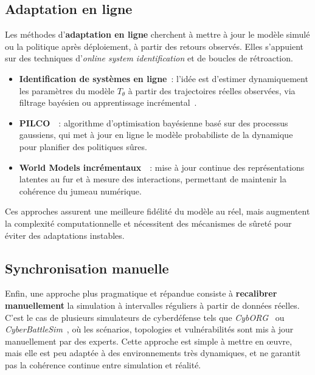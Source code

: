 \subsection{Adaptation en ligne}

\noindent
Les méthodes d’\textbf{adaptation en ligne} cherchent à
mettre à jour le modèle simulé ou la politique après déploiement,
à partir des retours observés.
Elles s’appuient sur des techniques d’\textit{online system identification}
et de boucles de rétroaction.

\begin{itemize}
  \item \textbf{Identification de systèmes en ligne}~: l’idée est d’estimer
        dynamiquement les paramètres du modèle $T_\theta$
        à partir des trajectoires réelles observées,
        via filtrage bayésien ou apprentissage incrémental~\cite{ljung1999system}.
  \item \textbf{PILCO}~\cite{deisenroth2011pilco}~: algorithme d’optimisation
        bayésienne basé sur des processus gaussiens,
        qui met à jour en ligne le modèle probabiliste de la dynamique
        pour planifier des politiques sûres.
  \item \textbf{World Models incrémentaux}~\cite{hafner2019learning}~:
        mise à jour continue des représentations latentes
        au fur et à mesure des interactions,
        permettant de maintenir la cohérence du jumeau numérique.
\end{itemize}

\noindent
Ces approches assurent une meilleure fidélité du modèle au réel,
mais augmentent la complexité computationnelle et nécessitent
des mécanismes de sûreté pour éviter des adaptations instables.

\subsection{Synchronisation manuelle}

\noindent
Enfin, une approche plus pragmatique et répandue consiste à
\textbf{recalibrer manuellement} la simulation
à intervalles réguliers à partir de données réelles.
C’est le cas de plusieurs simulateurs de cyberdéfense tels que
\textit{CybORG}~\cite{Standen2021} ou
\textit{CyberBattleSim}~\cite{cyberbattlesim},
où les scénarios, topologies et vulnérabilités sont mis à jour
manuellement par des experts.
Cette approche est simple à mettre en œuvre,
mais elle est peu adaptée à des environnements très dynamiques,
et ne garantit pas la cohérence continue entre simulation et réalité.

